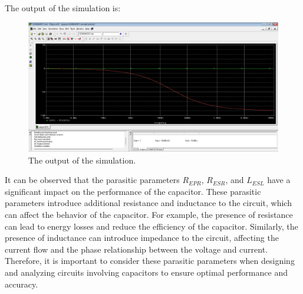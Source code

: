 \documentclass[11pt]{article}
\begin{document}
\begin{question}
\begin{subquestion}
{            The output of the simulation is:
            \begin{figure}[H]
                \centering
                \includegraphics[scale=0.35,angle=0]{Fig/Q7_3.png}
                \caption{The output of the simulation.}
            \end{figure}

            It can be observed that the parasitic parameters \( R_{EPR} \), \( R_{ESR} \), and \( L_{ESL} \) have a significant impact on the performance of the capacitor.
            These parasitic parameters introduce additional resistance and inductance to the circuit,
            which can affect the behavior of the capacitor.
            For example, the presence of resistance can lead to energy
            losses and reduce the efficiency of the capacitor.
            Similarly, the presence of inductance can introduce
            impedance to the circuit, affecting the current
            flow and the phase relationship between the voltage and current.
            Therefore, it is important to consider these parasitic parameters
            when designing and analyzing circuits involving capacitors to
            ensure optimal performance and accuracy.
        }
    \end{subquestion}

\end{question}

\end{document}
